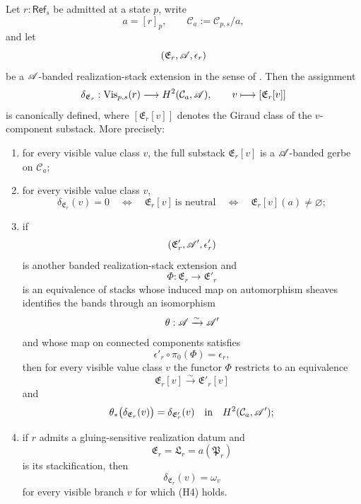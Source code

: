 \begin{theorem}\label{thm:intrinsic-branch-obstruction-extension}
Let $r:\mathsf{Ref}_s$ be admitted at a state $p$, write
\[
a=[r]_p,
\qquad
\mathcal C_a:=\mathcal C_{p,s}/a,
\]
and let
\[
(\mathfrak E_r,\mathscr{A},\epsilon_r)
\]
be a $\mathscr{A}$-banded realization-stack extension in the sense of . Then the assignment
\[
\delta_{\mathfrak E_r}:\mathrm{Vis}_{p,s}(r)\longrightarrow H^2(\mathcal C_a,\mathscr{A}),
\qquad
v\longmapsto [\mathfrak E_r[v]]
\]
is canonically defined, where $[\mathfrak E_r[v]]$ denotes the Giraud class of the $v$-component substack. More precisely:
\begin{enumerate}[label=(\roman*),nosep]
\item for every visible value class $v$, the full substack $\mathfrak E_r[v]$ is a $\mathscr{A}$-banded gerbe on $\mathcal C_a$;
\item for every visible value class $v$,
\[
\delta_{\mathfrak E_r}(v)=0
\quad\Longleftrightarrow\quad
\mathfrak E_r[v]\ \text{is neutral}
\quad\Longleftrightarrow\quad
\mathfrak E_r[v](a)\neq\varnothing;
\]
\item if
\[
(\mathfrak E'_r,\mathscr{A}',\epsilon'_r)
\]
is another banded realization-stack extension and
\[
\Phi:\mathfrak E_r\to \mathfrak E'_r
\]
is an equivalence of stacks whose induced map on automorphism sheaves identifies the bands through an isomorphism
\[
\theta:\mathscr{A}\xrightarrow{\sim}\mathscr{A}'
\]
and whose map on connected components satisfies
\[
\epsilon'_r\circ \pi_0(\Phi)=\epsilon_r,
\]
then for every visible value class $v$ the functor $\Phi$ restricts to an equivalence
\[
\mathfrak E_r[v]\xrightarrow{\sim}\mathfrak E'_r[v]
\]
and
\[
\theta_*\bigl(\delta_{\mathfrak E_r}(v)\bigr)=\delta_{\mathfrak E'_r}(v)
\quad\text{in}\quad
H^2(\mathcal C_a,\mathscr{A}');
\]
\item if $r$ admits a gluing-sensitive realization datum and
\[
\mathfrak E_r=\mathfrak L_r=a(\mathfrak P_r)
\]
is its stackification, then
\[
\delta_{\mathfrak E_r}(v)=\omega_v
\]
for every visible branch $v$ for which \textup{(H4)} holds.
\end{enumerate}
\end{theorem}

